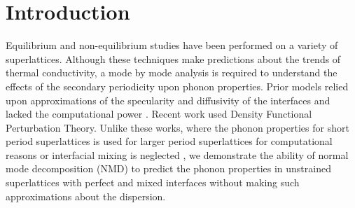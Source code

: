 \documentclass[aps,prb,preprint,preprintnumbers,amsmath,amssymb,floatfix,superscriptaddress]{revtex4}
\begin{document}
\section{Introduction}
Equilibrium \cite {PhysRevB.85.195302} and non-equilibrium \cite {PhysRevB.79.214307,PhysRevB.79.075316,PhysRevB.72.174302} studies have been performed on a variety of superlattices. Although these techniques make predictions about the trends of thermal conductivity, a mode by mode analysis is required to understand the effects of the secondary periodicity upon phonon properties. Prior models relied upon approximations of the specularity and diffusivity of the interfaces \cite {PhysRevB.57.14958} and lacked the computational power \cite {PhysRevB.70.081310}. Recent work \cite{Luckyanova16112012,doi:10.1021/nl202186y} used Density Functional Perturbation Theory. Unlike these works, where the phonon properties for short period superlattices is used for larger period superlattices for computational reasons \cite{Luckyanova16112012, doi:10.1021/nl202186y} or interfacial mixing is neglected \cite{doi:10.1021/nl202186y}, we demonstrate the ability of normal mode decomposition (NMD) to predict the phonon properties in unstrained superlattices with perfect and mixed interfaces without making such approximations about the dispersion.
\end{document}
